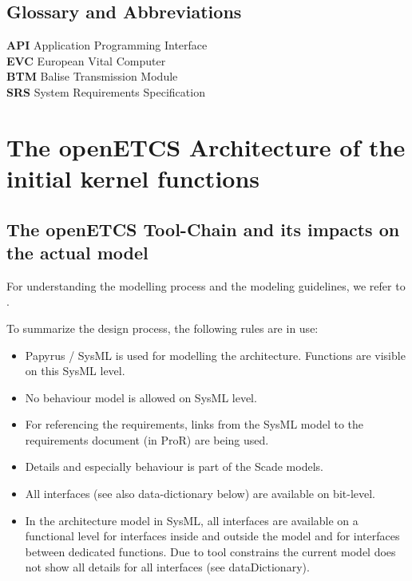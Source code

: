 \documentclass{template/openetcs_article}
\begin{document}
\subsection{Glossary and Abbreviations}

\textbf{API} Application Programming Interface\\
\textbf{EVC} European Vital Computer\\
\textbf{BTM} Balise Transmission Module\\
\textbf{SRS} System Requirements Specification\\

\section{The openETCS Architecture of the initial kernel functions}

\subsection{The openETCS Tool-Chain and its impacts on the actual model}

For understanding the modelling process and the modeling guidelines, we refer to \cite{wp3-dow}. 

To summarize the design process, the following rules are in use:
\begin{itemize}
\item Papyrus / SysML is used for modelling the architecture. Functions are visible on this SysML level.
\item No behaviour model is allowed on SysML level.
\item For referencing the requirements, links from the SysML model to the requirements document (in ProR) are being used.
\item Details and especially behaviour is part of the Scade models.
\item All interfaces (see also data-dictionary below) are available on bit-level.
\item In the architecture model in SysML, all interfaces are available on a functional level for interfaces inside and outside the model and for interfaces between dedicated functions. Due to tool constrains the current model does not show all details for all interfaces (see dataDictionary).
\end{itemize}
\end{document}
